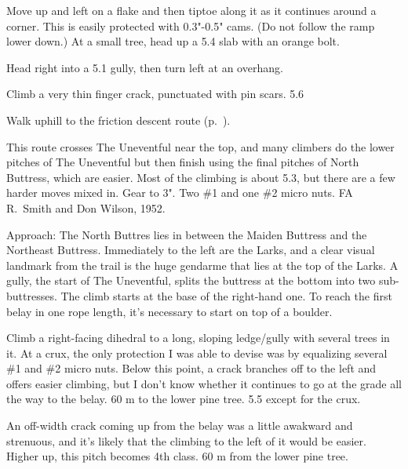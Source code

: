 \documentclass{tahquitz}
\begin{document}
 Move up and left on a flake
and then tiptoe along it as it continues around a corner.
This is easily protected with 0.3"-0.5" cams. (Do not follow the ramp lower down.) At a small
tree, head up a 5.4 slab with an orange bolt.

 Head right into a 5.1 gully, then turn left at an overhang.

 Climb a very thin finger crack, punctuated with pin scars. 5.6

Walk uphill to the friction descent route  (p.~\pageref{subsec:friction-descent}).





This route crosses The Uneventful near the top, and many climbers do the lower
pitches of The Uneventful but then finish using the final pitches of
North Buttress, which are easier. Most of the climbing is about 5.3,
but there are a few harder moves mixed in. Gear to 3". Two \#1 and one \#2 micro nuts.
FA R.~Smith and Don Wilson, 1952.

Approach: The North Buttres lies
in between the Maiden Buttress and the Northeast Buttress. Immediately
to the left are the Larks, and a clear visual landmark from the trail
is the huge gendarme that lies at the top of the Larks. A gully, the start
of The Uneventful, splits the buttress at the bottom into two sub-buttresses.
The climb starts at the base of the right-hand one.
To reach the first belay in one rope length, it's necessary to start on top of a boulder.

 Climb a right-facing dihedral to a long, sloping ledge/gully with
several trees in it. At a crux, the only protection I was able to devise was by
equalizing several \#1 and \#2 micro nuts. Below this point, a crack branches off
to the left and offers easier climbing, but I don't know whether it continues
to go at the grade all the way to the belay. 60 m to the lower pine tree. 5.5 except for
the crux.

 An off-width crack coming up from the belay was a little awakward and strenuous, and
it's likely that the climbing to the left of it would be easier. Higher up, this pitch
becomes 4th class. 60 m from the lower pine tree.
\end{document}
